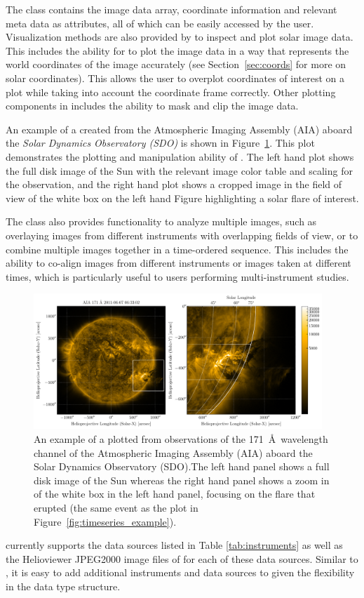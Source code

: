The \Map class contains the image data array, coordinate information and relevant meta data as attributes, all of which can be easily accessed by the user. 
Visualization methods are also provided by \Map to inspect and plot solar image data. 
This includes the ability for \Map to plot the image data in a way that represents the world coordinates of the image accurately (see Section~\ref{sec:coords} for more on solar coordinates).
This allows the user to overplot coordinates of interest on a \Map plot while taking into account the coordinate frame correctly. 
Other plotting components in \Map includes the ability to mask and clip the image data. 

An example of a \Map created from the Atmospheric Imaging Assembly (AIA) aboard the \textit{Solar Dynamics Observatory (SDO)} is shown in Figure~\ref{fig:map_example}. 
This plot demonstrates the plotting and manipulation ability of \Map.
The left hand plot shows the full disk image of the Sun with the relevant image color table and scaling for the observation, and the right hand plot shows a cropped image in the field of view of the white box on the left hand Figure highlighting a solar flare of interest.

The \Map class also provides functionality to analyze multiple images, such as overlaying images from different instruments with overlapping fields of view, or to combine multiple images together in a time-ordered sequence.  
This includes the ability to co-align images from different instruments or images taken at different times, which is particularly useful to users performing multi-instrument studies. 


\begin{figure}
    \centering
    \includegraphics[width=0.97\textwidth]{figures/map_example.pdf}
    \caption{An example of a \sunpypkg \Map plotted from observations of the 171~\AA\ wavelength channel of the Atmospheric Imaging Assembly (AIA) aboard the Solar Dynamics Observatory (SDO).The left hand panel shows a full disk image of the Sun whereas the right hand panel shows a zoom in of the white box in the left hand panel, focusing on the flare that erupted (the same event as the \Timeseries plot in Figure~\ref{fig:timeseries_example}).}
    \label{fig:map_example}
\end{figure}

\Map currently supports the data sources listed in Table \ref{tab:instruments} as well as the Helioviewer JPEG2000 image files of for each of these data sources. Similar to \Timeseries, it is easy to add additional instruments and data sources to \Map given the flexibility in the data type structure. 
